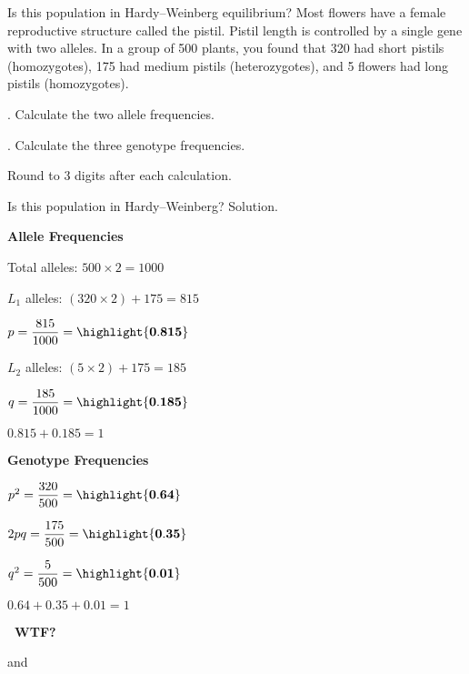 \documentclass[t]{beamer}
\begin{document}
\begin{frame}{Is this population in Hardy--Weinberg equilibrium?}
	\vspace{-1\baselineskip}
	\hangpara Most flowers have a female reproductive structure called the pistil. Pistil length is controlled by a single gene with two alleles. In a group of 500 plants, you found that 320 had short pistils (homozygotes), 175 had medium pistils (heterozygotes), and 5 flowers had long pistils (homozygotes). 

	. Calculate the two allele frequencies.

	. Calculate the three genotype frequencies.

	\hangpara Round to 3 digits after each calculation.
\end{frame}
%
{
\begin{frame}{Is this population in Hardy--Weinberg? Solution.}
\vspace{-1\baselineskip}
\begin{multicols}{2}

	\hangpara \textbf{Allele Frequencies}
	
	\hangpara Total alleles: $500 \times 2 = 1000$
	
	\hangpara $L_1$ alleles: $(320 \times 2) + 175 = 815$
	
	\hangpara $p = \dfrac{815}{1000} = \highlight{\mathbf{0.815}}$

	\hangpara $L_2$ alleles: $(5 \times 2) + 175 = 185$ 

	\hangpara $q = \dfrac{185}{1000} = \highlight{\mathbf{0.185}}$
	
	\hangpara $0.815 + 0.185 = 1$ \checkmark

\columnbreak

	\hangpara \textbf{Genotype Frequencies}
	
	\hangpara $p^2 = \dfrac{320}{500} = \highlight{\mathbf{0.64}}$ 

	\hangpara $2pq = \dfrac{175}{500} = \highlight{\mathbf{0.35}}$

	\hangpara $q^2 = \dfrac{5}{500} = \highlight{\mathbf{0.01}}$

	\hangpara $0.64 + 0.35 + 0.01 = 1$ \checkmark
	
	\hangpara {}
	\textbf{\ WTF?}\vspace{-0.5\baselineskip}
	
	\hangpara {} and
	

\end{multicols}
\end{frame}
}
\end{document}
